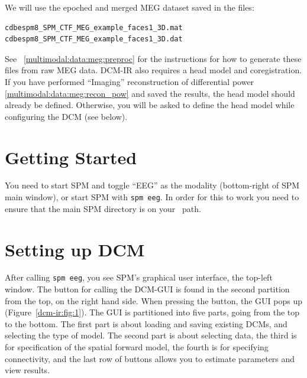 We will use the epoched and merged MEG dataset saved in the files:

\begin{verbatim}
cdbespm8_SPM_CTF_MEG_example_faces1_3D.mat
cdbespm8_SPM_CTF_MEG_example_faces1_3D.dat
\end{verbatim}

See ~\ref{multimodal:data:meg:preproc} for the instructions for how to generate these files from raw MEG data. DCM-IR also requires a head model and coregistration. If you have performed ``Imaging'' reconstruction of differential power \ref{multimodal:data:meg:recon_pow} and saved the results, the head model should already be defined. Otherwise, you will be asked to define the head model while configuring the DCM (see below).

\section{Getting Started}

You need to start SPM and toggle ``EEG'' as the modality (bottom-right of SPM main window), or start SPM with \texttt{spm eeg}. In order for this to work you need to ensure that the main SPM directory is on your \matlab\ path.

\section{Setting up DCM}

After calling \texttt{spm eeg}, you see SPM's graphical user interface, the top-left window. The button for calling the DCM-GUI is found in the second partition from the top, on the right hand side. When pressing the button, the GUI pops up (Figure~\ref{dcm-ir:fig:1}). The GUI is partitioned into five parts, going from the top to the bottom. The first part is about loading and saving existing DCMs, and selecting the type of model. The second part is about selecting data, the third is for specification of the spatial forward model, the fourth is for specifying connectivity, and the last row of buttons allows you to estimate parameters and view results.


